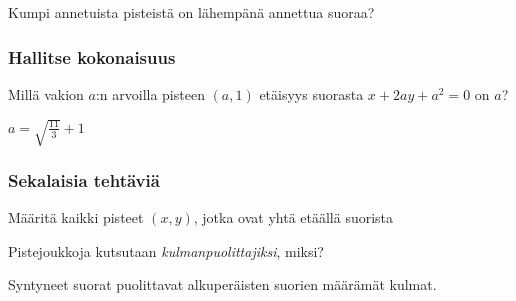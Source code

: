 \begin{tehtavasivu}
\begin{tehtava}
Kumpi annetuista pisteistä on lähempänä annettua suoraa?
\begin{alakohdat}
\end{alakohdat}
\begin{vastaus}
\begin{alakohdat}
\end{alakohdat}
\end{vastaus}
\end{tehtava}

\subsubsection*{Hallitse kokonaisuus}

\begin{tehtava}
Millä vakion $a$:n arvoilla pisteen $(a,1)$ etäisyys suorasta $x+2ay+a^2 = 0$ on $a$?

\begin{vastaus}
$a = \sqrt{\frac{11}{3}}+1$
\end{vastaus} 
\end{tehtava}

\subsubsection*{Sekalaisia tehtäviä}

\begin{tehtava}
Määritä kaikki pisteet $(x,y)$, jotka ovat yhtä etäällä suorista
\begin{alakohdat}
\end{alakohdat}
Pistejoukkoja kutsutaan \emph{kulmanpuolittajiksi}, miksi?
\begin{vastaus}
\begin{alakohdat}
Syntyneet suorat puolittavat alkuperäisten suorien määrämät kulmat.
\end{alakohdat}
\end{vastaus}
\end{tehtava}


\end{tehtavasivu}
